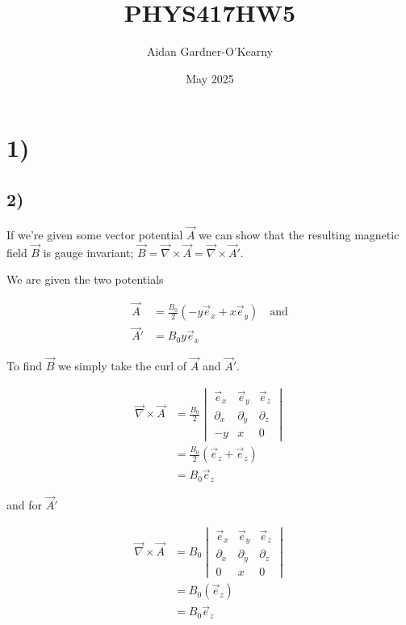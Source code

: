 \documentclass{article}
\title{PHYS417HW5}
\author{Aidan Gardner-O'Kearny}
\date{May 2025}
\newcommand{\p}[1]{\left(#1\right)}
\begin{document}
\maketitle

\section*{1)}
\subsection*{2)}

If we're given some vector potential $\vec{A}$ we can show that the resulting magnetic field $\vec{B}$ is gauge invariant; $\vec{B}=\vec{\nabla}\times\vec{A}=\vec{\nabla}\times\vec{A}'$.

We are given the two potentials

\begin{align*}
    \vec{A}&=\frac{B_0}{2}\p{-y\vec{e}_x+x\vec{e}_y}\quad\text{and}\\[1em]
    \vec{A}'&=B_0y\vec{e}_x
\end{align*}

To find $\vec{B}$ we simply take the curl of $\vec{A}$ and $\vec{A}'$.

\begin{align*}
    \vec{\nabla}\times\vec{A}&=\frac{B_0}{2}
    \begin{vmatrix}
        \vec{e}_x &\vec{e}_y &\vec{e}_z \\
        \partial_x &\partial_y &\partial_z \\
        -y &x &0
    \end{vmatrix}\\[1em]
    &=\frac{B_0}{2}\p{\vec{e}_z+\vec{e}_z}\\
    &=B_0\vec{e}_z
\end{align*}

and for $\vec{A}'$

\begin{align*}
    \vec{\nabla}\times\vec{A}&=B_0
    \begin{vmatrix}
        \vec{e}_x &\vec{e}_y &\vec{e}_z \\
        \partial_x &\partial_y &\partial_z \\
        0 &x &0
    \end{vmatrix}\\[1em]
    &=B_0\p{\vec{e}_z}\\
    &=B_0\vec{e}_z
\end{align*}
\end{document}
